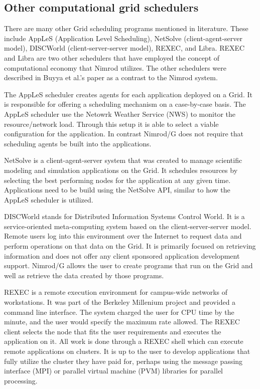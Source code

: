 \documentclass[conference]{IEEEtran}
\begin{document}
\subsection{\textbf{Other computational grid schedulers}}
There are many other Grid scheduling programs mentioned in literature. These include AppLeS (Application Level Scheduling), NetSolve (client-agent-server model), DISCWorld (client-server-server model), REXEC, and Libra. \cite{nimrod} REXEC and Libra are two other schedulers that have employed the concept of computational economy that Nimrod utilizes. The other schedulers were described in Buyya et al.'s paper as a contrast to the Nimrod system. 

The AppLeS scheduler creates agents for each application deployed on a Grid. It is responsible for offering a scheduling mechanism on a case-by-case basis. The AppLeS scheduler use the Netowrk Weather Service (NWS) to monitor the resource/network load. Through this setup it is able to select a viable configuration for the application. In contrast Nimrod/G does not require that scheduling agents be built into the applications. 

NetSolve is a client-agent-server system that was created to manage scientific modeling and simulation applications on the Grid. It schedules resources by selecting the best performing nodes for the application at any given time. Applications need to be build using the NetSolve API, similar to how the AppLeS scheduler is utilized. 

DISCWorld stands for Distributed Information Systems Control World. It is a service-oriented meta-computing system based on the client-server-server model. Remote users log into this environment over the Internet to request data and perform operations on that data on the Grid. It is primarily focused on retrieving information and does not offer any client sponsored application development support. Nimrod/G allows the user to create programs that run on the Grid and well as retrieve the data created by those programs. 

REXEC is a remote execution environment for campus-wide networks of workstations. It was part of the Berkeley Millenium project and provided a command line interface. The system charged the user for CPU time by the minute, and the user would specify the maximum rate allowed. The REXEC client selects the node that fits the user requirements and executes the application on it. All work is done through a REXEC shell which can execute remote applications on clusters. It is up to the user to develop applications that fully utilize the cluster they have paid for, perhaps using the message passing interface (MPI) or parallel virtual machine (PVM) libraries for parallel processing. 
\end{document}
